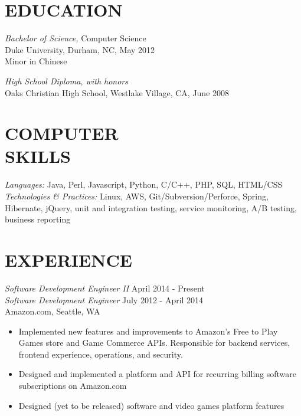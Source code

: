 \documentclass[line,margin]{res}
\begin{document}
    \setlength{\pdfpageheight}{\paperheight}
    \setlength{\pdfpagewidth}{\paperwidth}
\address{1000 Minor Ave. Apt. 305, Seattle, WA, 98104}
\address{alex@galonsky.com}

 
\begin{resume}
\section{EDUCATION} 
    {\sl Bachelor of Science,} Computer Science \\
    Duke University, Durham, NC, 
    May 2012 \\
    Minor in Chinese

    {\sl High School Diploma, with honors} \\
    Oaks Christian High School, Westlake Village, CA, June 2008
 
\section{COMPUTER \\ SKILLS} 
    {\sl Languages:} Java, Perl, Javascript, Python, C/C++, PHP, SQL, HTML/CSS \\
    {\sl Technologies \& Practices:} Linux, AWS, Git/Subversion/Perforce, Spring, Hibernate, jQuery, unit and integration testing, service monitoring, A/B testing, business reporting
 
\section{EXPERIENCE} 

    {\sl Software Development Engineer II} \hfill April 2014 - Present \\
    {\sl Software Development Engineer} \hfill July 2012 - April 2014 \\
        Amazon.com, Seattle, WA
        \begin{itemize}  \itemsep -2pt %
            \item Implemented new features and improvements to Amazon's Free to Play Games store and Game Commerce APIs. Responsible for backend services, frontend experience, operations, and security.
            \item Designed and implemented a platform and API for recurring billing software subscriptions on Amazon.com
            \item Designed (yet to be released) software and video games platform features
        \end{itemize}


\end{resume}
\end{document}
